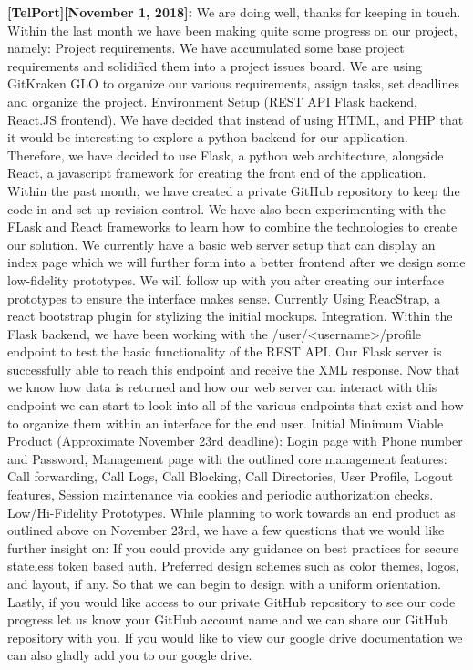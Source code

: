 \documentclass[12pt]{article}
\begin{document}
\textbf{[TelPort][November 1, 2018]:} We are doing well, thanks for keeping in touch. Within the last month we have been making quite some progress on our project, namely: Project requirements. We have accumulated some base project requirements and solidified them into a project issues board. We are using GitKraken GLO to organize our various requirements, assign tasks, set deadlines and organize the project. Environment Setup (REST API Flask backend, React.JS frontend). We have decided that instead of using HTML, and PHP that it would be interesting to explore a python backend for our application. Therefore, we have decided to use Flask, a python web architecture, alongside React, a javascript framework for creating the front end of the application. Within the past month, we have created a private GitHub repository to keep the code in and set up revision control. We have also been experimenting with the FLask and React frameworks to learn how to combine the technologies to create our solution. We currently have a basic web server setup that can display an index page which we will further form into a better frontend after we design some low-fidelity prototypes. We will follow up with you after creating our interface prototypes to ensure the interface makes sense. Currently Using ReacStrap, a react bootstrap plugin for stylizing the initial mockups. Integration. Within the Flask backend, we have been working with the /user/<username>/profile endpoint to test the basic functionality of the REST API. Our Flask server is successfully able to reach this endpoint and receive the XML response. Now that we know how data is returned and how our web server can interact with this endpoint we can start to look into all of the various endpoints that exist and how to organize them within an interface for the end user. Initial Minimum Viable Product (Approximate November 23rd deadline): Login page with Phone number and Password, Management page with the outlined core management features: Call forwarding, Call Logs, Call Blocking, Call Directories, User Profile, Logout features, Session maintenance via cookies and periodic authorization checks. Low/Hi-Fidelity Prototypes. While planning to work towards an end product as outlined above on November 23rd, we have a few questions that we would like further insight on: If you could provide any guidance on best practices for secure stateless token based auth. Preferred design schemes such as color themes, logos, and layout, if any. So that we can begin to design with a uniform orientation. Lastly, if you would like access to our private GitHub repository to see our code progress let us know your GitHub account name and we can share our GitHub repository with you. If you would like to view our google drive documentation we can also gladly add you to our google drive.
\end{document}
